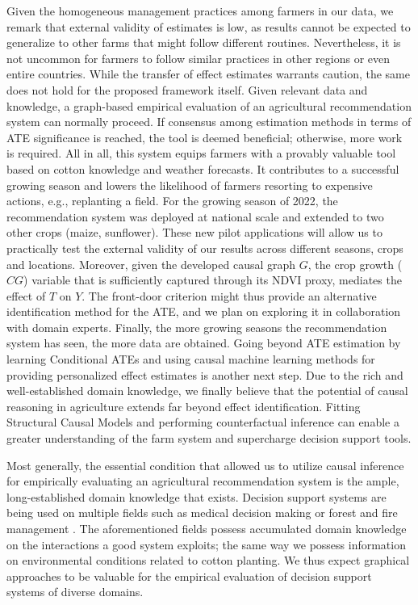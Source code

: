 \documentclass[letterpaper]{article} %
\begin{document}
Given the homogeneous management practices among farmers in our data, we remark that external validity of estimates is low, as results cannot be expected to generalize to other farms that might follow different routines. Nevertheless, it is not uncommon for farmers to follow similar practices in other regions or even entire countries. While the transfer of effect estimates warrants caution, the same does not hold for the proposed framework itself. Given relevant data and knowledge, a graph-based empirical evaluation of an agricultural recommendation system can normally proceed. If consensus among estimation methods in terms of ATE significance is reached, the tool is deemed beneficial; otherwise, more work is required.
All in all, this system equips farmers with a provably valuable tool based on cotton knowledge and weather forecasts. It contributes to a successful growing season and lowers the likelihood of farmers resorting to expensive actions, e.g., replanting a field.  For the growing season of 2022, the recommendation system was deployed at national scale and extended to two other crops (maize, sunflower).
These new pilot applications will allow us to practically test the external validity of our results across different seasons, crops and locations. Moreover, given the developed causal graph $G$, the crop growth ($CG$) variable that is sufficiently captured through its NDVI proxy, mediates the effect of $T$ on $Y$. The front-door criterion \cite{pearl2009causality} might thus provide an alternative identification method for the ATE, and we plan on exploring it in collaboration with domain experts. Finally, the more growing seasons the recommendation system has seen, the more data are obtained. Going beyond ATE estimation by learning Conditional ATEs and using causal machine learning methods for providing personalized effect estimates is another next step. Due to the rich and well-established domain knowledge, we finally believe that the potential of causal reasoning in agriculture extends far beyond effect identification. Fitting Structural Causal Models and performing counterfactual inference can enable a greater understanding of the farm system and supercharge decision support tools.

Most generally, the essential condition that allowed us to utilize causal inference for empirically evaluating an agricultural recommendation system is the ample, long-established domain knowledge that exists. Decision support systems are being used on multiple fields \cite{marakas2003decision} such as medical decision making \cite{sutton2020overview} or forest and fire management \cite{segura2014decision, martell2015review}. The aforementioned fields possess accumulated domain knowledge on the interactions a good system exploits; the same way we possess information on environmental conditions related to cotton planting. We thus expect graphical approaches to be valuable for the empirical evaluation of decision support systems of diverse domains.
\end{document}
